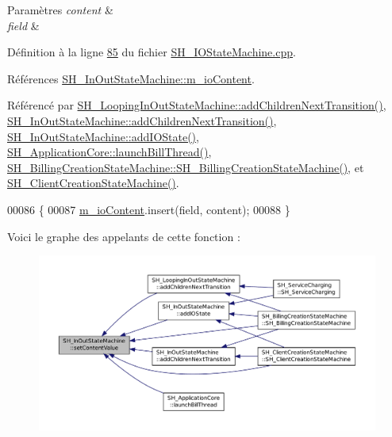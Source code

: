 \begin{DoxyParams}{Paramètres}
{\em content} & \\
\hline
{\em field} & \\
\hline
\end{DoxyParams}


Définition à la ligne \hyperlink{SH__IOStateMachine_8cpp_source_l00085}{85} du fichier \hyperlink{SH__IOStateMachine_8cpp_source}{S\-H\-\_\-\-I\-O\-State\-Machine.\-cpp}.



Références \hyperlink{classSH__InOutStateMachine_a8cfbc27eef057bf37b7711bdfef2077e}{S\-H\-\_\-\-In\-Out\-State\-Machine\-::m\-\_\-io\-Content}.



Référencé par \hyperlink{classSH__LoopingInOutStateMachine_abfae9f47019379f270496de46845c729}{S\-H\-\_\-\-Looping\-In\-Out\-State\-Machine\-::add\-Children\-Next\-Transition()}, \hyperlink{classSH__InOutStateMachine_aa78420f8778d7777809aad77eb8473b4}{S\-H\-\_\-\-In\-Out\-State\-Machine\-::add\-Children\-Next\-Transition()}, \hyperlink{classSH__InOutStateMachine_a2528cffddbe6f98c32ebef41423c0118}{S\-H\-\_\-\-In\-Out\-State\-Machine\-::add\-I\-O\-State()}, \hyperlink{classSH__ApplicationCore_ab72fd6cdc47575d47157fc7bdffae8f2}{S\-H\-\_\-\-Application\-Core\-::launch\-Bill\-Thread()}, \hyperlink{classSH__BillingCreationStateMachine_ad62b77fa4aeafe200056ff3974562f83}{S\-H\-\_\-\-Billing\-Creation\-State\-Machine\-::\-S\-H\-\_\-\-Billing\-Creation\-State\-Machine()}, et \hyperlink{classSH__ClientCreationStateMachine_a0b406b0f404c0fd33bf35be8ce0cc811}{S\-H\-\_\-\-Client\-Creation\-State\-Machine()}.


\begin{DoxyCode}
00086 \{
00087     \hyperlink{classSH__InOutStateMachine_a8cfbc27eef057bf37b7711bdfef2077e}{m\_ioContent}.insert(field, content);
00088 \}
\end{DoxyCode}


Voici le graphe des appelants de cette fonction \-:\nopagebreak
\begin{figure}[H]
\begin{center}
\leavevmode
\includegraphics[width=350pt]{classSH__InOutStateMachine_a9ab1534306b2bdb62743d4bcefe40c17_icgraph}
\end{center}
\end{figure}


